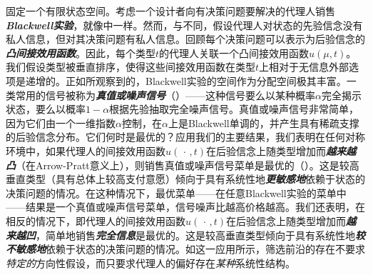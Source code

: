 \documentclass[12pt,letterpaper]{article}
\newenvironment{translation}{\color{blue}\noindent}{}
\theoremstyle{plain}
\theoremstyle{definition}
\theoremstyle{remark}
\renewcommand{\1}{\mathds{1}}
\theoremstyle{definition}
\begin{document}
\begin{translation}
固定一个有限状态空间。考虑一个设计者向有决策问题要解决的代理人销售\textit{\textbf{Blackwell实验}}，就像\citet*{bergemann2018design}中一样。然而，与\citet*{bergemann2018design}不同，假设代理人对状态的先验信念没有私人信息，但对其决策问题有私人信息。回顾每个决策问题可以表示为后验信念的\textit{\textbf{凸间接效用函数}}。因此，每个类型$t$的代理人关联一个凸间接效用函数$u(\mu, t)$。我们假设类型被垂直排序，使得这些间接效用函数在类型$t$上相对于无信息外部选项是递增的。正如\citet*{bergemann2018design}所观察到的，Blackwell实验的空间作为分配空间极其丰富。一类常用的信号被称为\textit{\textbf{真值或噪声信号}}（\citealt{lewis1994supplying}）——这种信号要么以某种概率$\alpha$完全揭示状态，要么以概率$1-\alpha$根据先验抽取完全噪声信号。真值或噪声信号非常简单，因为它们由一个一维指数$\alpha$控制，在$\alpha$上是Blackwell单调的，并产生具有稀疏支撑的后验信念分布。它们何时是最优的？应用我们的主要结果，我们表明在任何对称环境中，如果代理人的间接效用函数$u(\,\cdot\,, t)$在后验信念上随类型增加而\textit{\textbf{越来越凸}}（在Arrow-Pratt意义上），则销售真值或噪声信号菜单是最优的（）。这是较高垂直类型（具有总体上较高支付意愿）倾向于具有系统性地\textit{\textbf{更敏感地}}依赖于状态的决策问题的情况。在这种情况下，最优菜单——在任意Blackwell实验的菜单中——结果是一个真值或噪声信号菜单，信号噪声比越高价格越高。我们还表明，在相反的情况下，即代理人的间接效用函数$u(\,\cdot\,, t)$在后验信念上随类型增加而\textit{\textbf{越来越凹}}，简单地销售\textit{\textbf{完全信息}}是最优的。这是较高垂直类型倾向于具有系统性地\textit{\textbf{较不敏感地}}依赖于状态的决策问题的情况。如这一应用所示，筛选前沿的存在不要求\textit{特定的}方向性假设，而只要求代理人的偏好存在\textit{某种}系统性结构。
\end{translation}
\end{document}
